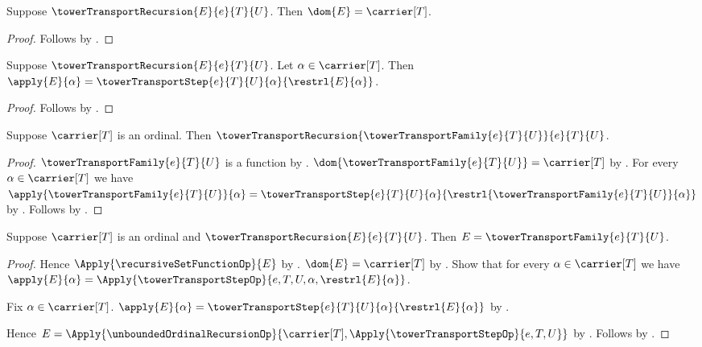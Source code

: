 \begin{proposition}\label{tower_transport_recursion_domain}
    Suppose $\towerTransportRecursion{E}{e}{T}{U}$.
    Then $\dom{E}=\carrier[T]$.
\end{proposition}
\begin{proof}
    Follows by .
\end{proof}

\begin{proposition}\label{tower_transport_recursion_equation}
    Suppose $\towerTransportRecursion{E}{e}{T}{U}$.
    Let $\alpha\in\carrier[T]$.
    Then $\apply{E}{\alpha}=
        \towerTransportStep{e}{T}{U}{\alpha}{\restrl{E}{\alpha}}$.
\end{proposition}
\begin{proof}
    Follows by .
\end{proof}

\begin{proposition}\label{tower_transport_family_satisfies_recursion}
    Suppose $\carrier[T]$ is an ordinal.
    Then $\towerTransportRecursion
        {\towerTransportFamily{e}{T}{U}}{e}{T}{U}$.
\end{proposition}
\begin{proof}
    $\towerTransportFamily{e}{T}{U}$ is a function by
        .
    $\dom{\towerTransportFamily{e}{T}{U}}=\carrier[T]$ by
        .
    For every $\alpha\in\carrier[T]$ we have
        $\apply{\towerTransportFamily{e}{T}{U}}{\alpha}=
        \towerTransportStep{e}{T}{U}{\alpha}{
            \restrl{\towerTransportFamily{e}{T}{U}}{\alpha}}$ by
        .
    Follows by .
\end{proof}

\begin{theorem}\label{tower_transport_recursion_unique}
    Suppose $\carrier[T]$ is an ordinal and
        $\towerTransportRecursion{E}{e}{T}{U}$.
    Then $E=\towerTransportFamily{e}{T}{U}$.
\end{theorem}
\begin{proof}
    Hence $\Apply{\recursiveSetFunctionOp}{E}$ by
        .
    $\dom{E}=\carrier[T]$ by
        .
    Show that for every $\alpha\in\carrier[T]$ we have
        $\apply{E}{\alpha}=
        \Apply{\towerTransportStepOp}
                {e,T,U,\alpha,\restrl{E}{\alpha}}$.
    \begin{subproof}
        Fix $\alpha\in\carrier[T]$.
        $\apply{E}{\alpha}=
            \towerTransportStep{e}{T}{U}{\alpha}{\restrl{E}{\alpha}}$ by
            .
    \end{subproof}
    Hence $E=
        \Apply{\unboundedOrdinalRecursionOp}
            {\carrier[T],\Apply{\towerTransportStepOp}{e,T,U}}$ by
        .
    Follows by .
\end{proof}

